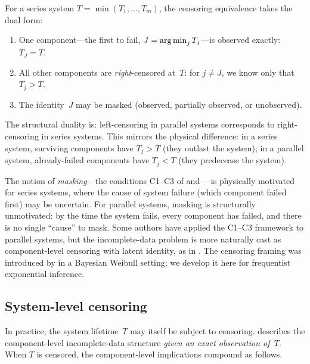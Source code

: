 \begin{remark}\label{rmk:series-parallel}
For a series system $T = \min(T_1, \ldots, T_m)$, the censoring equivalence
takes the dual form:
\begin{enumerate}
  \item[\textup{(a$'$)}] One component---the first to fail,
    $J = \operatorname*{arg\,min}_j T_j$---is observed exactly: $T_J = T$.
  \item[\textup{(b$'$)}] All other components are \emph{right}-censored at~$T$:
    for $j \neq J$, we know only that $T_j > T$.
  \item[\textup{(c$'$)}] The identity~$J$ may be masked (observed, partially
    observed, or unobserved).
\end{enumerate}
The structural duality is: left-censoring in parallel systems corresponds to
right-censoring in series systems.  This mirrors the physical difference: in a
series system, surviving components have $T_j > T$ (they outlast the system); in
a parallel system, already-failed components have $T_j < T$ (they predecease the
system).

The notion of \emph{masking}---the conditions C1--C3 of
\citet{Miyakawa1984} and \citet{LinUsherGuess1993}---is physically motivated
for series systems, where the cause of system failure (which component failed
first) may be uncertain.  For parallel systems, masking is structurally
unmotivated: by the time the system fails, every component has failed, and
there is no single ``cause'' to mask.  Some authors
\citep{LiuShiZhangBai2017, RodriguesPereiraBheringPolpo2018} have
applied the C1--C3 framework to parallel systems, but the incomplete-data
problem is more naturally cast as component-level censoring with latent
identity, as in .  The censoring framing was
introduced by \citet{BheringPereiraPolpo2014} in a Bayesian Weibull setting;
we develop it here for frequentist exponential inference.
\end{remark}

\subsection{System-level censoring}
\label{sec:system-censoring}

In practice, the system lifetime~$T$ may itself be subject to censoring.
 describes the component-level incomplete-data
structure \emph{given an exact observation of~$T$}.  When $T$ is censored,
the component-level implications compound as follows.

